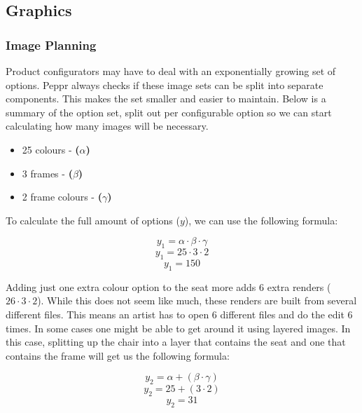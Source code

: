 \subsection{Graphics}

\subsubsection{Image Planning}
Product configurators may have to deal with an exponentially growing set of options. Peppr always checks if these image sets can be split into separate components. This makes the set smaller and easier to maintain. Below is a summary of the option set, split out per configurable option so we can start calculating how many images will be necessary.
\begin{itemize}
	\item 25 colours - \textbf{(\( \alpha \))}
	\item 3 frames - \textbf{(\( \beta \))}
	\item 2 frame colours - \textbf{(\( \gamma \))}
\end{itemize}

To calculate the full amount of options ($y$), we can use the following formula:
 
\[ y_1 = \alpha \cdot \beta \cdot \gamma\]
\[ y_1 = 25 \cdot 3 \cdot 2\]
\[ y_1 = 150\]

Adding just one extra colour option to the seat more adds 6 extra renders ($26 \cdot 3 \cdot 2$). While this does not seem like much, these renders are built from several different files. This means an artist has to open 6 different files and do the edit 6 times.
In some cases one might be able to get around it using layered images. In this case, splitting up the chair into a layer that contains the seat and one that contains the frame will get us the following formula:

\[ y_2 = \alpha + (\beta \cdot \gamma)\]
\[ y_2 = 25 + (3 \cdot 2) \]
\[ y_2 = 31\]

